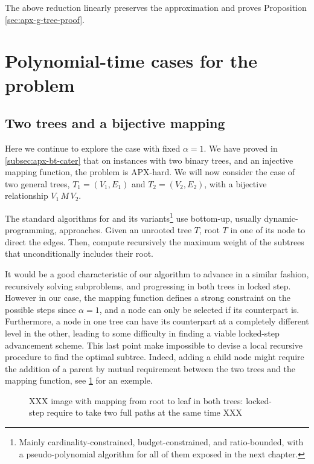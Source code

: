 		The above reduction linearly preserves the approximation and proves Proposition \ref{sec:apx-g-tree-proof}.

	\section{Polynomial-time cases for the \mwccs{} problem}
	\label{sec:poly}


		\subsection{Two trees and a bijective mapping}
		\label{subsec:tree1o1}

			Here we continue to explore the case with fixed $\alpha = 1$.
			We have proved in \cref{subsec:apx-bt-cater} that on instances with two binary trees, and an injective mapping function, the problem is APX-hard.
			We will now consider the case of two general trees, $T_1 = (V_1, E_1)$ and $T_2 = (V_2, E_2)$, with a bijective relationship $V_1\,M\,V_2$.

			The standard algorithms for \mwcs{} and its variants\footnote{Mainly cardinality-constrained, budget-constrained, and ratio-bounded, with a pseudo-polynomial algorithm for all of them exposed in the next chapter.} use bottom-up, usually dynamic-programming, approaches.
			Given an unrooted tree $T$, root $T$ in one of its node to direct the edges.
			Then, compute recursively the maximum weight of the subtrees that unconditionally includes their root.

			It would be a good characteristic of our algorithm to advance in a similar fashion, recursively solving subproblems, and progressing in both trees in locked step.
			However in our case, the mapping function defines a strong constraint on the possible steps since $\alpha=1$, and a node can only be selected if its counterpart is.
			Furthermore, a node in one tree can have its counterpart at a completely different level in the other, leading to some difficulty in finding a viable locked-step advancement scheme.
			This last point make impossible to devise a local recursive procedure to find the optimal subtree.
			Indeed, adding a child node might require the addition of a parent by mutual requirement between the two trees and the mapping function, see \cref{fig:childReqParent} for an exemple.

			\begin{figure}[ht]
				\centering
				\label{fig:childReqParent}
				\caption{XXX image with mapping from root to leaf in both trees: locked-step require to take two full paths at the same time XXX}
			\end{figure}

